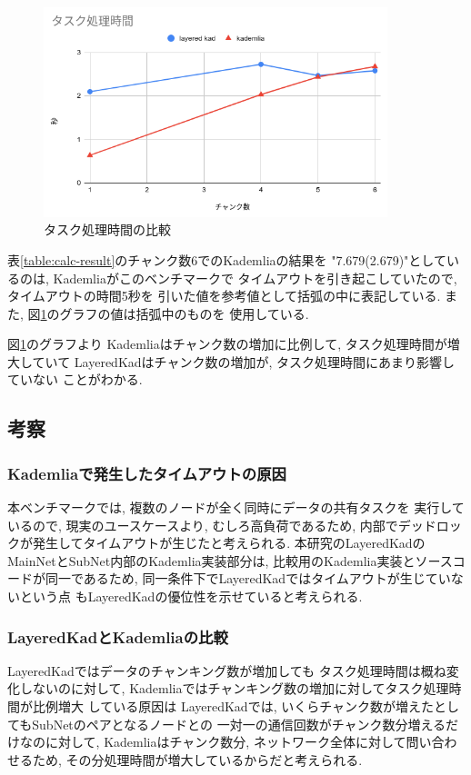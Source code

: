 \documentclass[sotsuron]{jcsie}
\begin{document}
\begin{figure}[H]
	\centering
	\includegraphics[width=10cm]{./assets/image/calc_compare.png}
	\caption{タスク処理時間の比較}
	\label{fig:calc_compare.png}
\end{figure}

表\ref{table:calc-result}のチャンク数6でのKademliaの結果を
"7.679(2.679)"としているのは, Kademliaがこのベンチマークで
タイムアウトを引き起こしていたので, タイムアウトの時間5秒を
引いた値を参考値として括弧の中に表記している.
また, 図\ref{fig:calc_compare.png}のグラフの値は括弧中のものを
使用している.

図\ref{fig:calc_compare.png}のグラフより
Kademliaはチャンク数の増加に比例して, タスク処理時間が増大していて
LayeredKadはチャンク数の増加が, タスク処理時間にあまり影響していない
ことがわかる.

\subsection{考察}
\subsubsection{Kademliaで発生したタイムアウトの原因}
本ベンチマークでは, 複数のノードが全く同時にデータの共有タスクを
実行しているので, 現実のユースケースより, むしろ高負荷であるため, 
内部でデッドロックが発生してタイムアウトが生じたと考えられる.
本研究のLayeredKadのMainNetとSubNet内部のKademlia実装部分は, 
比較用のKademlia実装とソースコードが同一であるため, 
同一条件下でLayeredKadではタイムアウトが生じていないという点
もLayeredKadの優位性を示せていると考えられる.
\subsubsection{LayeredKadとKademliaの比較}
LayeredKadではデータのチャンキング数が増加しても
タスク処理時間は概ね変化しないのに対して, 
Kademliaではチャンキング数の増加に対してタスク処理時間が比例増大
している原因は
LayeredKadでは, いくらチャンク数が増えたとしてもSubNetのペアとなるノードとの
一対一の通信回数がチャンク数分増えるだけなのに対して, 
Kademliaはチャンク数分, ネットワーク全体に対して問い合わせるため, 
その分処理時間が増大しているからだと考えられる.
\end{document}
